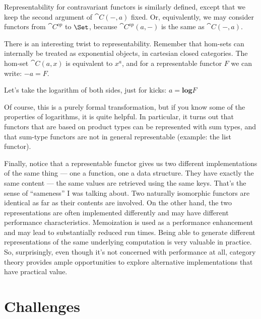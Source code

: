 Representability for contravariant functors is similarly defined, except
that we keep the second argument of $\cat{C}(-, a)$ fixed. Or,
equivalently, we may consider functors from $\cat{C}^{op}$
to $\Set$, because $\cat{C}^{op}(a, -)$ is the same as
$\cat{C}(-, a)$.

There is an interesting twist to representability. Remember that
hom-sets can internally be treated as exponential objects, in cartesian
closed categories. The hom-set $\cat{C}(a, x)$ is equivalent to
$x^a$, and for a representable functor $F$ we can write: $-a = F$.

Let's take the logarithm of both sides, just for kicks: $a = \mathbf{log}F$

Of course, this is a purely formal transformation, but if you know some
of the properties of logarithms, it is quite helpful. In particular, it
turns out that functors that are based on product types can be
represented with sum types, and that sum-type functors are not in
general representable (example: the list functor).

Finally, notice that a representable functor gives us two different
implementations of the same thing --- one a function, one a data
structure. They have exactly the same content --- the same values are
retrieved using the same keys. That's the sense of ``sameness'' I was
talking about. Two naturally isomorphic functors are identical as far as
their contents are involved. On the other hand, the two representations
are often implemented differently and may have different performance
characteristics. Memoization is used as a performance enhancement and
may lead to substantially reduced run times. Being able to generate
different representations of the same underlying computation is very
valuable in practice. So, surprisingly, even though it's not concerned
with performance at all, category theory provides ample opportunities to
explore alternative implementations that have practical value.

\section{Challenges}

